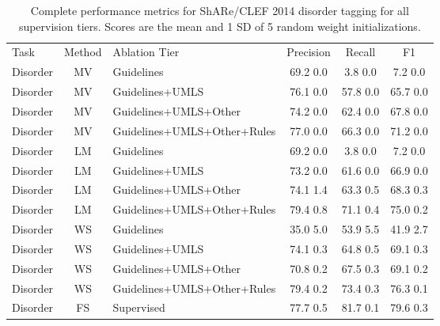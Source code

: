 \documentclass{article}
\begin{document}
\begin{table}[H]
\centering
\begin{tabular}{lclccc} \toprule
Task & Method & Ablation Tier & Precision & Recall & F1 \\
\cmidrule(lr){1-6}
Disorder   &   MV   &   Guidelines   &   69.2 0.0   &   3.8 0.0   &   7.2 0.0  \\
Disorder   &   MV   &   Guidelines+UMLS   &   76.1 0.0   &   57.8 0.0   &   65.7 0.0  \\
Disorder   &   MV   &   Guidelines+UMLS+Other   &   74.2 0.0   &   62.4 0.0   &   67.8 0.0  \\
Disorder   &   MV   &   Guidelines+UMLS+Other+Rules   &   77.0 0.0   &   66.3 0.0   &   71.2 0.0  \\
\cmidrule(lr){1-6}
Disorder   &   LM   &   Guidelines   &   69.2 0.0   &   3.8 0.0   &   7.2 0.0  \\
Disorder   &   LM   &   Guidelines+UMLS   &   73.2 0.0   &   61.6 0.0   &   66.9 0.0  \\
Disorder   &   LM   &   Guidelines+UMLS+Other   &   74.1 1.4   &   63.3 0.5   &   68.3 0.3  \\
Disorder   &   LM   &   Guidelines+UMLS+Other+Rules   &   79.4 0.8   &   71.1 0.4   &   75.0 0.2  \\
\cmidrule(lr){1-6}
Disorder   &   WS   &   Guidelines   &   35.0 5.0   &   53.9 5.5   &   41.9 2.7  \\
Disorder   &   WS   &   Guidelines+UMLS   &   74.1 0.3   &   64.8 0.5   &   69.1 0.3  \\
Disorder   &   WS   &   Guidelines+UMLS+Other   &   70.8 0.2   &   67.5 0.3   &   69.1 0.2  \\
Disorder   &   WS   &   Guidelines+UMLS+Other+Rules   &   79.4 0.2   &   73.4 0.3   &   76.3 0.1  \\
\cmidrule(lr){1-6}
Disorder   &   FS   &   Supervised   &   77.7 0.5   &   81.7 0.1   &   79.6 0.3  \\
\bottomrule  
\end{tabular}
\caption{ \label{tbl:diseases} Complete performance metrics for ShARe/CLEF 2014 disorder tagging for all supervision tiers.
Scores are the mean and 1 SD of 5 random weight initializations.
}
\end{table}
\end{document}
